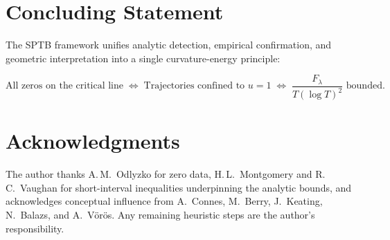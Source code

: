 \section{Concluding Statement}

The SPTB framework unifies analytic detection, empirical confirmation,
and geometric interpretation into a single curvature-energy principle:

\[
\boxed{
\text{All zeros on the critical line}
\;\Longleftrightarrow\;
\text{Trajectories confined to }u=1
\;\Longleftrightarrow\;
\frac{F_\lambda}{T(\log T)^2}\text{ bounded.}
}
\]

\section*{Acknowledgments}

The author thanks A.\,M.~Odlyzko for zero data,
H.\,L.~Montgomery and R.\,C.~Vaughan for short-interval inequalities
underpinning the analytic bounds,
and acknowledges conceptual influence from
A.~Connes, M.~Berry, J.~Keating, N.~Balazs, and A.~Vörös.
Any remaining heuristic steps are the author’s responsibility.
